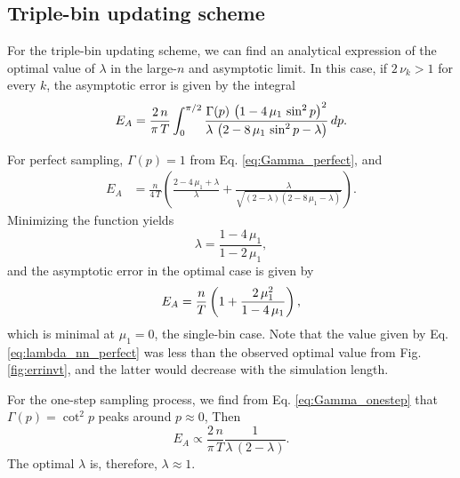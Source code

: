 \documentclass[reprint, floatfix]{revtex4-1}
\newcommand{\Err}{E}
\begin{document}
\subsection{\label{sec:invt_nn}
Triple-bin updating scheme}




For the triple-bin updating scheme,
we can find an analytical expression
of the optimal value of $\lambda$
in the large-$n$ and asymptotic limit.
%
In this case,
if $2 \, \nu_k > 1$ for every $k$,
the asymptotic error is given by the integral
%
\begin{align}
  \Err_A
  =
  \frac{ 2 \, n  }
       { \pi \, T }
  \int_0^{\pi/2}
    \frac{ \Gamma(p) \, \left(1 - 4 \, \mu_1 \, \sin^2 p \right)^2    }
         {   \lambda \, \left(2 - 8 \, \mu_1 \, \sin^2 p - \lambda \right) }
  \, dp
  .
\notag
\end{align}



For perfect sampling,
$\Gamma(p) = 1$ from Eq. \eqref{eq:Gamma_perfect},
and
$$
\begin{aligned}
  \Err_A
  &=
  \frac{n}{4 \, T}
  \left(
    \frac{2 - 4 \, \mu_1 + \lambda}{ \lambda }
    +
    \frac{ \lambda }
    { \sqrt{ (2 - \lambda) (2 - 8 \, \mu_1 - \lambda) } }
  \right)
.
\end{aligned}
$$
%
Minimizing the function yields
%
\begin{equation}
  \lambda
  =
  \frac{ 1 - 4 \, \mu_1 }
       { 1 - 2 \, \mu_1 }
  ,
\label{eq:lambda_nn_perfect}
\end{equation}
%
and the asymptotic error in the optimal case is given by
%
\begin{equation}
  \Err_A
  =
  \frac{n}{T}
  \left(
    1+ \frac{2 \, \mu_1^2}{1-4 \, \mu_1}
  \right)
  ,
\notag
\end{equation}
%
which
is minimal at $\mu_1 = 0$, the single-bin case.
%
Note that the value given by
Eq. \eqref{eq:lambda_nn_perfect}
was less than the observed optimal value
from Fig. \ref{fig:errinvt},
and the latter would decrease
with the simulation length.
%




For the one-step sampling process,
we find from Eq. \eqref{eq:Gamma_onestep}
that $\Gamma(p) = \cot^2 p$
peaks around $p \approx 0$,
%
Then
$$
  \Err_A
  \propto
  \frac{   2 \, n }
       { \pi \, T }
  \frac{             1             }
       {  \lambda \, (2 - \lambda) }
  .
$$
%
The optimal $\lambda$ is, therefore,
%
$
  \lambda \approx 1.
$
%
\end{document}
